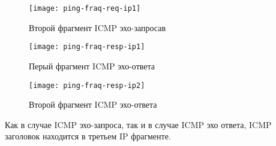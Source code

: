 \begin{figure}[H]
	\centering
	\texttt{[image: ping-fraq-req-ip1]}
	\caption{Второй фрагмент ICMP эхо-запросав}
	\label{fig:ping-fraq-req-ip2}
\end{figure}

\begin{figure}[H]
	\centering
	\texttt{[image: ping-fraq-resp-ip1]}
	\caption{Перый фрагмент ICMP эхо-ответа}
	\label{fig:ping-fraq-resp-ip1}
\end{figure}

\begin{figure}[H]
	\centering
	\texttt{[image: ping-fraq-resp-ip2]}
	\caption{Второй фрагмент ICMP эхо-ответа}
	\label{fig:ping-fraq-resp-ip2}
\end{figure}

Как в случае ICMP эхо-запроса, так и в случае ICMP эхо ответа, ICMP заголовок находится в третьем IP фрагменте.


